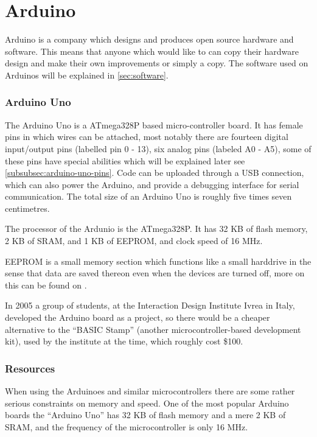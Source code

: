 
\section{Arduino}
Arduino is a company which designs and produces open source hardware and software.
This means that anyone which would like to can copy their hardware design and make their own improvements or simply a copy.
The software used on Arduinos will be explained in \ref{sec:software}.

\subsubsection{Arduino Uno}
The Arduino Uno is a ATmega328P based micro-controller board.
It has female pins in which wires can be attached, most notably there are fourteen digital input/output pins (labelled pin 0 - 13), six analog pins (labeled A0 - A5), some of these pins have special abilities which will be explained later see \ref{subsubsec:arduino-uno-pins}.
Code can be uploaded through a USB connection, which can also power the Arduino, and provide a debugging interface for serial communication.
The total size of an Arduino Uno is roughly five times seven centimetres. 

The processor of the Ardunio is the ATmega328P.
It has 32 KB of flash memory, 2 KB of SRAM, and 1 KB of EEPROM, and clock speed of 16 MHz.

EEPROM is a small memory section which functions like a small harddrive in the sense that data are saved thereon even when the devices are turned off, more on this can be found on \cite{EEPROM}.

\begin{tcolorbox}[floatplacement=b,float,colback=white!5,colframe=aaublue!50,title=The Birth of the Arduino  \cite{birthofarduino}]
In 2005 a group of students, at the Interaction Design Institute Ivrea in Italy, developed the Arduino board as a project, so there would be a cheaper alternative to the ``BASIC Stamp'' (another microcontroller-based development kit), used by the institute at the time, which roughly cost \$100.
\end{tcolorbox}

\subsubsection{Resources}
When using the Arduinoes and similar microcontrollers there are some rather serious constraints on memory and speed.
One of the most popular Arduino boards the ``Arduino Uno'' has 32 KB of flash memory and a mere 2 KB of SRAM, and the frequency of the microcontroller is only 16 MHz.

